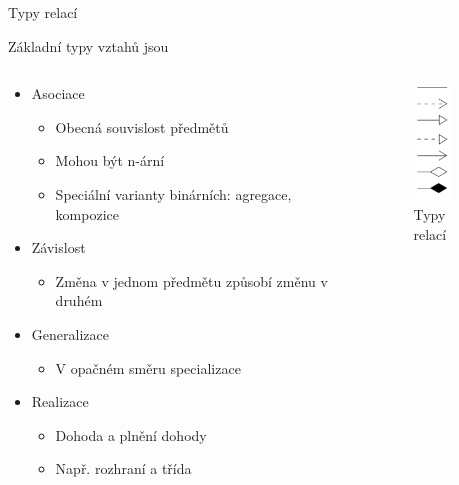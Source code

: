 \begin{frame}{Typy relací}

\onslide<+-> Základní typy vztahů jsou

\begin{columns}[T]

	\begin{column}{0.7\textwidth}
		\begin{itemize}
			\item<+-> Asociace
			\onslide<+->
			\begin{itemize}
				\item Obecná souvislost předmětů
				\item Mohou být n-ární
				\item Speciální varianty binárních: agregace, kompozice
			\end{itemize}
			
			\item<+-> Závislost
			\begin{itemize}
				\item Změna v jednom předmětu způsobí změnu v druhém
			\end{itemize}
			
			\item<+-> Generalizace
			\onslide<+->
			\begin{itemize}
				\item V opačném směru specializace
			\end{itemize}
			
			\item<+-> Realizace
			\onslide<+->
			\begin{itemize}
				\item Dohoda a plnění dohody
				\item Např. rozhraní a třída
			\end{itemize}
		\end{itemize}
	\end{column}

	\begin{column}{0.3\textwidth}
		\begin{flushleft}
		\begin{figure}
			\includegraphics[width=10mm]{img/relace/relace.png}
			\caption{Typy relací}
		\end{figure}
		\end{flushleft}
	\end{column}

\end{columns}	

\end{frame}

